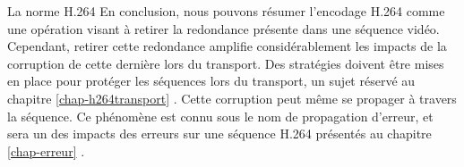 \begin{chapter}{La norme H.264}
En conclusion, nous pouvons résumer l'encodage H.264 comme une opération visant
à retirer la redondance présente dans une séquence vidéo. Cependant, retirer
cette redondance amplifie considérablement les impacts de la corruption de cette
dernière lors du transport. Des stratégies doivent être mises en place pour
protéger les séquences lors du transport, un sujet réservé au chapitre
\ref{chap-h264transport} . Cette corruption peut même
se propager à travers la séquence. Ce phénomène est connu sous le nom de
propagation d'erreur, et sera un des impacts des erreurs sur une séquence H.264
présentés au chapitre
\ref{chap-erreur} .

\end{chapter}